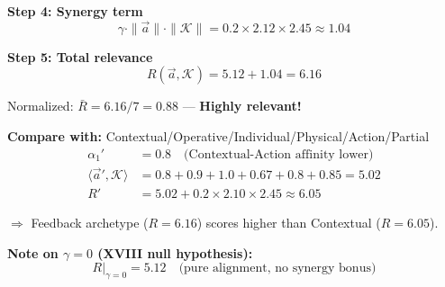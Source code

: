 \begin{tcolorbox}[colback=yellow!5!white, colframe=yellow!75!black,
    title=\textbf{Worked Example: Inner Product Score Calculation}]
\textbf{Step 4: Synergy term}
\begin{equation*}
\gamma \cdot \|\vec{a}\| \cdot \|\mathcal{K}\| = 0.2 \times 2.12 \times 2.45 \approx \mathbf{1.04}
\end{equation*}

\textbf{Step 5: Total relevance}
\begin{equation*}
\boxed{R(\vec{a}, \mathcal{K}) = 5.12 + 1.04 = \mathbf{6.16}}
\end{equation*}

Normalized: $\bar{R} = 6.16 / 7 = \mathbf{0.88}$ --- \textbf{Highly relevant!}

\medskip
\textbf{Compare with:} Contextual/Operative/Individual/Physical/Action/Partial
\begin{align*}
\alpha_1' &= 0.8 \quad \text{(Contextual-Action affinity lower)} \\
\langle \vec{a}', \mathcal{K} \rangle &= 0.8 + 0.9 + 1.0 + 0.67 + 0.8 + 0.85 = 5.02 \\
R' &= 5.02 + 0.2 \times 2.10 \times 2.45 \approx \mathbf{6.05}
\end{align*}

$\Rightarrow$ Feedback archetype ($R = 6.16$) scores higher than Contextual ($R = 6.05$).

\medskip
\textbf{Note on $\gamma = 0$ (XVIII null hypothesis):}
\begin{equation*}
R|_{\gamma=0} = 5.12 \quad \text{(pure alignment, no synergy bonus)}
\end{equation*}

\end{tcolorbox}

